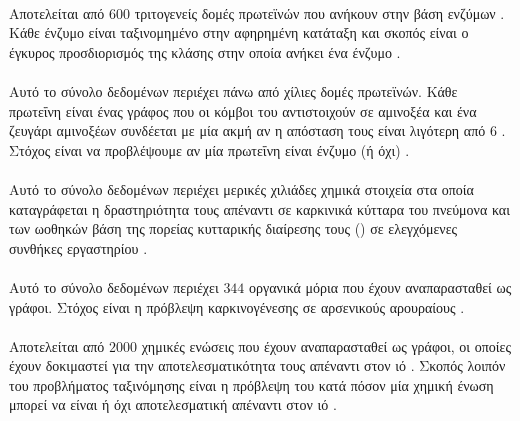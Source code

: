 \paragraph*{} Αποτελείται από $600$ τριτογενείς δομές πρωτεϊνών που ανήκουν στην βάση ενζύμων .
Κάθε ένζυμο είναι ταξινομημένο στην αφηρημένη κατάταξη  και σκοπός είναι ο έγκυρος προσδιορισμός της κλάσης στην οποία ανήκει ένα ένζυμο \cite{Borgwardt2005}.

\paragraph*{} Αυτό το σύνολο δεδομένων περιέχει πάνω από χίλιες δομές πρωτεϊνών.
Κάθε πρωτεΐνη είναι ένας γράφος που οι κόμβοι του αντιστοιχούν σε αμινοξέα και ένα ζευγάρι αμινοξέων συνδέεται με μία ακμή αν η απόσταση τους είναι λιγότερη από 6 .
Στόχος είναι να προβλέψουμε αν μία πρωτεΐνη είναι ένζυμο (ή όχι) \cite{DobsonDoig03, shervashidze2011weisfeiler}.

\paragraph*{} Αυτό το σύνολο δεδομένων περιέχει μερικές χιλιάδες χημικά στοιχεία στα οποία καταγράφεται η δραστηριότητα τους απέναντι σε καρκινικά κύτταρα του πνεύμονα και των ωοθηκών βάση της πορείας κυτταρικής διαίρεσης τους () σε ελεγχόμενες συνθήκες εργαστηρίου \cite{Wale2008}.

\paragraph*{} Αυτό το σύνολο δεδομένων περιέχει $344$ οργανικά μόρια που έχουν αναπαρασταθεί ως γράφοι.
Στόχος είναι η πρόβλεψη καρκινογένεσης σε αρσενικούς αρουραίους \cite{Toivonen2003}.

\paragraph*{} Αποτελείται από $2000$ χημικές ενώσεις που έχουν αναπαρασταθεί ως γράφοι, οι οποίες έχουν δοκιμαστεί για την αποτελεσματικότητα τους απέναντι στον ιό . Σκοπός λοιπόν του προβλήματος ταξινόμησης είναι η πρόβλεψη του κατά πόσον μία χημική ένωση μπορεί να είναι ή όχι αποτελεσματική απέναντι στον ιό \cite{Riesen08}.

